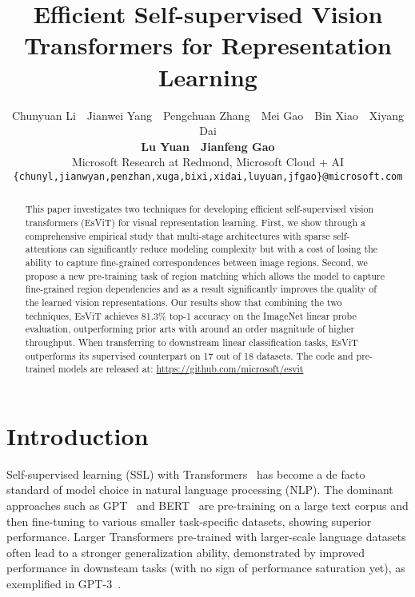 \documentclass{article} \usepackage{iclr2022_conference,times}
\title{Efficient  Self-supervised Vision \\Transformers for Representation Learning}
\author{Chunyuan Li \,\, Jianwei Yang \,\,  Pengchuan Zhang \,\, Mei Gao \,\, Bin Xiao \,\, Xiyang Dai  \\ 
  \textbf{Lu Yuan} \,\, \textbf{Jianfeng Gao} \\
  Microsoft Research at Redmond, Microsoft Cloud + AI\\
\texttt{\{chunyl,jianwyan,penzhan,xuga,bixi,xidai,luyuan,jfgao\}@microsoft.com}
}
\newcommand{\shortname}{EsViT}
\begin{document}
\maketitle


\maketitle

\begin{abstract}
  
This paper investigates two techniques for developing efficient self-supervised vision transformers (\shortname{}) for visual representation learning. First, we show through a comprehensive empirical study that multi-stage architectures with sparse self-attentions can significantly reduce modeling complexity but with a cost of losing the ability to capture fine-grained correspondences between image regions. Second, we propose a new pre-training task of region matching which allows the model to capture fine-grained region dependencies and as a result significantly improves the quality of the learned vision representations. 
Our results show that combining the two techniques, \shortname{} achieves 81.3\% top-1 accuracy on the ImageNet linear probe evaluation, outperforming prior arts with around an order magnitude of higher throughput.  When transferring to downstream linear classification tasks, \shortname{} outperforms its supervised counterpart on 17 out of 18 datasets.
The code and pre-trained models are released at: \url{ https://github.com/microsoft/esvit}  




\end{abstract}



\section{Introduction}
\vspace{-2mm}
Self-supervised learning (SSL) with Transformers~\citep{vaswani2017attention} has become a de facto standard of model choice in natural language processing (NLP). The dominant approaches such as GPT~\citep{radford2018improving} and BERT~\citep{devlin2019bert} are pre-training on a large text corpus and then fine-tuning to various smaller task-specific datasets, showing superior performance. Larger Transformers pre-trained with larger-scale language datasets often lead to a stronger generalization ability, demonstrated by improved performance in downsteam tasks (with no sign of performance saturation yet), as exemplified in GPT-3~\citep{brown2020language}. 
\end{document}
